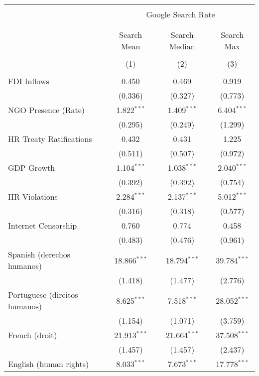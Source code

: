 
\begin{table}[!htbp] \centering 
  \caption{} 
  \label{} 
\begin{tabular}{@{\extracolsep{5pt}}lccc} 
\\[-1.8ex]\hline 
\hline \\[-1.8ex] 
 & \multicolumn{3}{c}{Google Search Rate} \\ 
\cline{2-4} 
\\[-1.8ex] & \multicolumn{3}{c}{ } \\ 
 & Search Mean & Search Median & Search Max \\ 
\\[-1.8ex] & (1) & (2) & (3)\\ 
\hline \\[-1.8ex] 
 FDI Inflows & 0.450 & 0.469 & 0.919 \\ 
  & (0.336) & (0.327) & (0.773) \\ 
  NGO Presence (Rate) & 1.822$^{***}$ & 1.409$^{***}$ & 6.404$^{***}$ \\ 
  & (0.295) & (0.249) & (1.299) \\ 
  HR Treaty Ratifications & 0.432 & 0.431 & 1.225 \\ 
  & (0.511) & (0.507) & (0.972) \\ 
  GDP Growth & 1.104$^{***}$ & 1.038$^{***}$ & 2.040$^{***}$ \\ 
  & (0.392) & (0.392) & (0.754) \\ 
  HR Violations & 2.284$^{***}$ & 2.137$^{***}$ & 5.012$^{***}$ \\ 
  & (0.316) & (0.318) & (0.577) \\ 
  Internet Censorship & 0.760 & 0.774 & 0.458 \\ 
  & (0.483) & (0.476) & (0.961) \\ 
  Spanish (derechos humanos) & 18.866$^{***}$ & 18.794$^{***}$ & 39.784$^{***}$ \\ 
  & (1.418) & (1.477) & (2.776) \\ 
  Portuguese (direitos humanos) & 8.625$^{***}$ & 7.518$^{***}$ & 28.052$^{***}$ \\ 
  & (1.154) & (1.071) & (3.759) \\ 
  French (droit) & 21.913$^{***}$ & 21.664$^{***}$ & 37.508$^{***}$ \\ 
  & (1.457) & (1.457) & (2.437) \\ 
  English (human rights) & 8.033$^{***}$ & 7.673$^{***}$ & 17.778$^{***}$ \\ 

\end{tabular}
\end{table}
